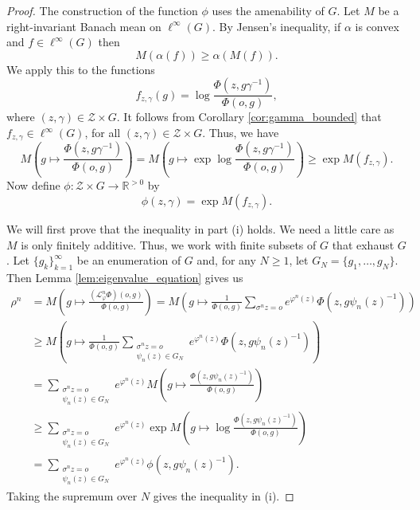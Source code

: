 \documentclass[11pt,letterpaper]{amsart}
\theoremstyle{definition}
\numberwithin{equation}{section}
\numberwithin{theorem}{section}
\def\vp{\varphi}
\begin{document}
\begin{proof}
The construction of the function $\phi$ uses the amenability of $G$.
Let $M$ be a right-invariant Banach mean on $\ell^\infty(G)$. By Jensen's inequality, if $\alpha$ is convex
and $f \in \ell^\infty(G)$
then
\[
M(\alpha(f)) \ge \alpha(M(f)).
\]
We apply this to the functions 
\[
f_{z,\gamma}(g) = \log \frac{\Phi(z,g\gamma^{-1})}{\Phi(o,g)},
\]
where $(z,\gamma) \in \mathcal Z \times G$.
It follows from Corollary \ref{cor:gamma_bounded} that $f_{z,\gamma} \in \ell^\infty(G)$, for all
$(z,\gamma) \in \mathcal Z \times G$. 
Thus, we have
\[
M\left(g \mapsto \frac{\Phi(z,g\gamma^{-1})}{\Phi(o,g)}\right)
= M\left(g \mapsto \exp \log \frac{\Phi(z,g\gamma^{-1})}{\Phi(o,g)}\right)
\ge \exp M(f_{z,\gamma}).
\]
Now define $\phi : \mathcal Z \times G \to \mathbb R^{>0}$ by
\[
\phi(z,\gamma) = \exp M(f_{z,\gamma}).
\]

We will first prove that the inequality in part (i) holds. We need a little care as $M$ is only finitely additive. Thus, we work with finite subsets of $G$ that exhaust $G$.
Let $\{g_k\}_{k=1}^\infty$ be an enumeration of $G$ and, for any $N \ge 1$, let 
$G_N = \{g_1,\ldots,g_N\}$. Then Lemma \ref{lem:eigenvalue_equation} gives us
\begin{align*}
\rho^n &=M\left(g \mapsto \frac{(\mathcal L_\vp^n \Phi)(o,g)}{\Phi(o,g)}\right)
= 
M
\left(g \mapsto \frac{1}{\Phi(o,g)}\sum_{\sigma^n z = o} e^{\vp^n(z)} \Phi(z,g\psi_n(z)^{-1})\right)
\\
&\ge
M
\left(g \mapsto \frac{1}{\Phi(o,g)}\sum_{\substack{\sigma^n z = o \\ \psi_n(z) \in G_N}} 
e^{\vp^n(z)} \Phi(z,g\psi_n(z)^{-1})\right)
\\
&=
\sum_{\substack{\sigma^n z = o \\ \psi_n(z) \in G_N}} e^{\vp^n(z)}
M\left(g \mapsto \frac{\Phi(z,g\psi_n(z)^{-1})}{\Phi(o,g)}\right)
\\
&\ge
\sum_{\substack{\sigma^n z = o \\ \psi_n(z) \in G_N}} e^{\vp^n(z)}
\exp M\left(g \mapsto \log \frac{\Phi(z,g\psi_n(z)^{-1})}{\Phi(o,g)}\right)
\\
&=
\sum_{\substack{\sigma^n z = o \\ \psi_n(z) \in G_N}} e^{\vp^n(z)}
\phi(z,g\psi_n(z)^{-1}).
\end{align*}
Taking the supremum over $N$ gives the inequality in (i).



\end{proof}
\end{document}
